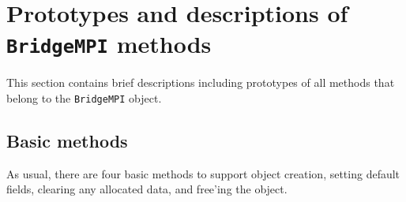 \section{Prototypes and descriptions of \texttt{BridgeMPI} methods}
\label{section:BridgeMPI:proto}
\par
This section contains brief descriptions including prototypes
of all methods that belong to the {\tt BridgeMPI} object.
\par
\subsection{Basic methods}
\label{subsection:BridgeMPI:proto:basics}
\par
As usual, there are four basic methods to support object creation,
setting default fields, clearing any allocated data, and free'ing
the object.
\par
